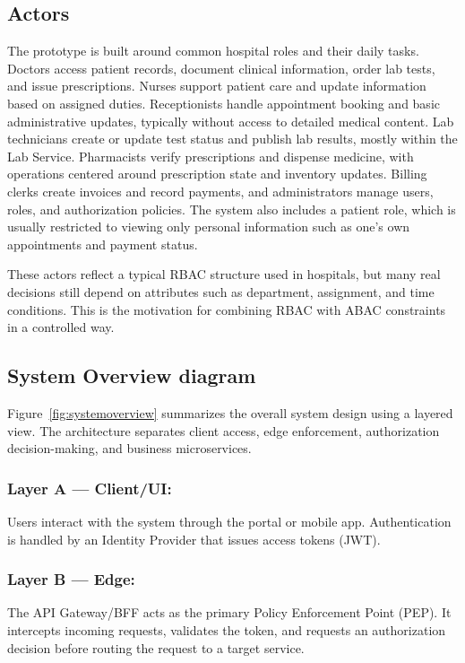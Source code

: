 \subsection{Actors}
\label{subsec:actors}
The prototype is built around common hospital roles and their daily tasks. Doctors access patient records, document clinical information, order lab tests, and issue prescriptions. Nurses support patient care and update information based on assigned duties. Receptionists handle appointment booking and basic administrative updates, typically without access to detailed medical content. Lab technicians create or update test status and publish lab results, mostly within the Lab Service. Pharmacists verify prescriptions and dispense medicine, with operations centered around prescription state and inventory updates. Billing clerks create invoices and record payments, and administrators manage users, roles, and authorization policies. The system also includes a patient role, which is usually restricted to viewing only personal information such as one’s own appointments and payment status.
\vspace{0.5cm}


These actors reflect a typical RBAC structure used in hospitals, but many real decisions still depend on attributes such as department, assignment, and time conditions. This is the motivation for combining RBAC with ABAC constraints in a controlled way.

\subsection{System Overview diagram}
Figure~\ref{fig:systemoverview} summarizes the overall system design using a layered view. The architecture separates client access, edge enforcement, authorization decision-making, and business microservices.


\subsubsection{Layer A — Client/UI:} Users interact with the system through the portal or mobile app. Authentication is handled by an Identity Provider that issues access tokens (JWT).

\subsubsection{Layer B — Edge:} The API Gateway/BFF acts as the primary Policy Enforcement Point (PEP). It intercepts incoming requests, validates the token, and requests an authorization decision before routing the request to a target service.

